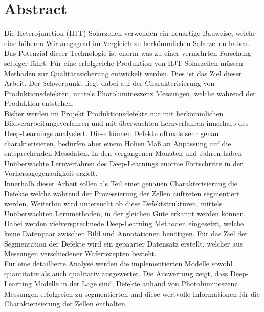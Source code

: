 
\quad
\addtocounter{page}{-1}
\chapter*{Abstract}
\thispagestyle{empty}
Die Heterojunction (HJT) Solarzellen verwenden ein neuartige Bauweise, welche eine höheren Wirkungsgrad im Vergleich zu herkömmlichen Solarzellen haben. Das Potenzial dieser Technologie ist enorm was zu einer vermehrten Forschung selbiger führt. Für eine erfolgreiche Produktion von HJT Solarzellen müssen Methoden zur Qualitätssicherung entwickelt werden. Dies ist das Ziel dieser Arbeit. Der Schwerpunkt liegt dabei auf der Charakterisierung von Produktionsdefekten, mittels Photolumineszenz Messungen, welche während der Produktion entstehen. \\
Bisher werden im Projekt Produktionsdefekte nur mit herkömmlichen Bildverarbeitungsverfahren und mit überwachten Lernverfahren innerhalb des Deep-Learnings analysiert. Diese können Defekte oftmals sehr genau charakterisieren, bedürfen aber einem Hohen Maß an Anpassung auf die entsprechenden Messdaten. In den vergangenen Monaten und Jahren haben Unüberwachte Lernverfahren des Deep-Learnings enorme Fortschritte in der Vorhersagegenauigkeit erzielt. \\
Innerhalb dieser Arbeit sollen als Teil einer genauen Charakterisierung die Defekte welche während der Prozessierung der Zellen auftreten segmentiert werden. Weiterhin wird untersucht ob diese Defektstrukturen, mittels Unüberwachten Lernmethoden, in der gleichen Güte erkannt werden können. Dabei werden vielversprechnede Deep-Learning Methoden eingesetzt, welche keine Datenpaar zwischen Bild und Annotationen benötigen. Für das Ziel der Segmentation der Defekte wird ein gepaarter Datensatz erstellt, welcher aus Messungen verschiedener Waferrezepten besteht. \\
Für eine detaillierte Analyse werden die implementierten Modelle sowohl quantitativ als auch qualitativ ausgewertet. Die Auswertung zeigt, dass Deep-Learning Modelle in der Lage sind, Defekte anhand von Photolumineszenz Messungen erfolgreich zu segmentierten und diese wertvolle Informationen für die Charakterisierung der Zellen enthalten. 

